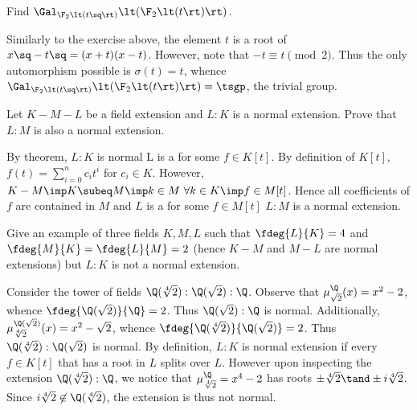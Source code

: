 \documentclass{article}
\begin{document}
\begin{subexercise}
  Find \( \Gal_{\F_2\lt(t\sq\rt)}\lt(\F_2\lt(t\rt)\rt) \).
\end{subexercise}
\begin{solution}
  Similarly to the exercise above, the element \( t \) is a root of \( x\sq-t\sq = (x+t)(x-t) \).
  However, note that \( -t \equiv t \pmod 2 \).
  Thus the only automorphism possible is \( \sigma(t) = t \), whence \( \Gal_{\F_2\lt(t\sq\rt)}\lt(\F_2\lt(t\rt)\rt) = \tsgp \), the trivial group.
\end{solution}

\begin{subexercise}
  Let \( K - M - L \) be a field extension and \( L:K \) is a normal extension.
  Prove that \( L:M \) is also a normal extension.
\end{subexercise}
\begin{solution}
By theorem, \( L:K \) is normal \iff L is a \sf for some \( f\in K[t] \).
By definition of \( K[t] \), \( f(t)=\sum\limits_{i=0}^n c_it^i \) for \( c_i\in K \).
However, \( K-M\imp K\subeq M \imp k\in M \ \forall k\in K \imp f\in M[t] \).
Hence all coefficients of \( f \) are contained in \( M \) and \( L \) is a \sf for some \( f\in M[t] \) \iff \( L:M \) is a normal extension.
\end{solution}

\begin{subexercise}
  Give an example of three fields \( K, M, L \) such that \( \fdeg{L}{K} = 4 \) and \( \fdeg{M}{K} = \fdeg{L}{M} = 2 \) (hence \( K-M \) and \( M-L \) are normal extensions) but \( L : K \) is not a normal extension.
\end{subexercise}
\begin{solution}
Consider the tower of fields \( \Q(\sqrt[4]2):\Q(\sqrt 2):\Q \).
Observe that \( \mu_{\sqrt 2}^\Q(x) = x^2-2 \), whence \( \fdeg{\Q(\sqrt 2)}{\Q} = 2 \).
Thus \( \Q(\sqrt 2):\Q \) is normal.
Additionally, \( \mu_{\sqrt[4] 2}^{\Q(\sqrt 2)}(x) = x^2-\sqrt 2 \), whence \( \fdeg{\Q(\sqrt[4] 2)}{\Q(\sqrt 2)} = 2 \).
Thus \( \Q(\sqrt[4] 2):\Q(\sqrt 2) \) is normal.
By definition, \( L:K \) is normal extension if every \( f\in K[t] \) that has a root in \( L \) splits over \( L \).
However upon inspecting the extension \( \Q(\sqrt[4]2):\Q \), we notice that \( \mu_{\sqrt[4]2}^\Q = x^4-2 \) has roots \( \pm\sqrt[4]2 \tand \pm i\sqrt[4]2 \).
Since \( i\sqrt[4]2 \not\in \Q(\sqrt[4]2) \), the extension is thus not normal.
\end{solution}
\end{document}
